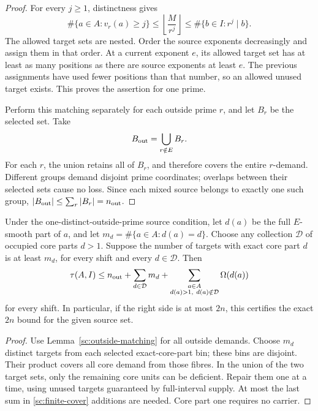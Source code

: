 \begin{proof}
For every \(j\ge1\), distinctness gives
\begin{equation}
 \#\{a\in A:v_r(a)\ge j\}
 \le\left\lfloor\frac M{r^j}\right\rfloor
 \le\#\{b\in I:r^j\mid b\}.
 \label{sc:nested-hall}
\end{equation}
The allowed target sets are nested. Order the source exponents
decreasingly and assign them in that order. At a current exponent
\(e\), its allowed target set has at least as many positions as
there are source exponents at least \(e\). The previous assignments
have used fewer positions than that number, so an allowed unused
target exists. This proves the assertion for one prime.

Perform this matching separately for each outside prime \(r\), and
let \(B_r\) be the selected set. Take
\[
 B_{\rm out}=\bigcup_{r\notin E}B_r.
\]
For each \(r\), the union retains all of \(B_r\), and therefore
covers the entire \(r\)-demand. Different groups demand disjoint
prime coordinates; overlaps between their selected sets cause no
loss. Since each mixed source belongs to exactly one such group,
\(|B_{\rm out}|\le\sum_r|B_r|=n_{\rm out}\).
\end{proof}

\begin{proposition}
\label{sc:finite-certificate}
Under the one-distinct-outside-prime source condition, let \(d(a)\)
be the full \(E\)-smooth part of \(a\), and let
\(m_d=\#\{a\in A:d(a)=d\}\).
Choose any collection \(\mathcal D\) of occupied core parts \(d>1\).
Suppose the number of targets with exact core part \(d\) is at least
\(m_d\), for every shift and every \(d\in\mathcal D\). Then
\begin{equation}
 \tau(A,I)\le n_{\rm out}+\sum_{d\in\mathcal D}m_d
       +\sum_{\substack{a\in A\\d(a)>1,\ d(a)\notin\mathcal D}}
                    \Omega(d(a))
 \label{sc:finite-cover}
\end{equation}
for every shift. In particular, if the right side is at most \(2n\),
this certifies the exact \(2n\) bound for the given source set.
\end{proposition}

\begin{proof}
Use Lemma~\ref{sc:outside-matching} for all outside demands.
Choose \(m_d\) distinct targets from each selected exact-core-part
bin; these bins are disjoint. Their product covers all core demand
from those fibres. In the union of the two target sets, only the
remaining core units can be deficient. Repair them one at a time,
using unused targets guaranteed by full-interval supply. At most
the last sum in \eqref{sc:finite-cover} additions are needed.
Core part one requires no carrier.
\end{proof}

